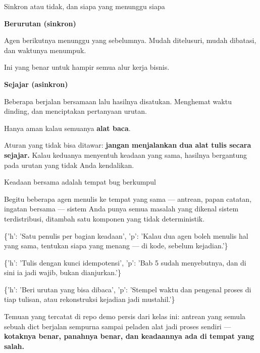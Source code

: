 \documentclass[aspectratio=169,11pt,t]{beamer}
\begin{document}
\begin{frame}[shrink=25]{Sinkron atau tidak, dan siapa yang menunggu siapa}
\begin{minipage}[t]{0.485\textwidth}
{\fontsize{9.4}{12.6}\selectfont\color{fg2}\textbf{Berurutan (sinkron)}\par}\vskip 4pt
{\fontsize{9.4}{12.6}\selectfont\color{fg2}Agen berikutnya menunggu yang sebelumnya. Mudah ditelusuri, mudah dibatasi, dan waktunya menumpuk.\par}\vskip 4pt
{\fontsize{9.4}{12.6}\selectfont\color{fg2}Ini yang benar untuk hampir semua alur kerja bisnis.\par}\vskip 4pt

\end{minipage}%
\hfill
\begin{minipage}[t]{0.485\textwidth}
{\fontsize{9.4}{12.6}\selectfont\color{fg2}\textbf{Sejajar (asinkron)}\par}\vskip 4pt
{\fontsize{9.4}{12.6}\selectfont\color{fg2}Beberapa berjalan bersamaan lalu hasilnya disatukan. Menghemat waktu dinding, dan menciptakan pertanyaan urutan.\par}\vskip 4pt
{\fontsize{9.4}{12.6}\selectfont\color{fg2}Hanya aman kalau semuanya \textbf{alat baca}.\par}\vskip 4pt

\end{minipage}%
\begin{iband}[signal]
Aturan yang tidak bisa ditawar: \textbf{jangan menjalankan dua alat tulis secara sejajar.} Kalau keduanya menyentuh keadaan yang sama, hasilnya bergantung pada urutan yang tidak Anda kendalikan.
\end{iband}
\end{frame}

\begin{frame}[shrink=25]{Keadaan bersama adalah tempat bug berkumpul}
{\fontsize{9.4}{12.6}\selectfont\color{fg2}Begitu beberapa agen menulis ke tempat yang sama --- antrean, papan catatan, ingatan bersama --- sistem Anda punya semua masalah yang dikenal sistem terdistribusi, ditambah satu komponen yang tidak deterministik.\par}\vskip 4pt
\begin{isteps}
\item \{'h': 'Satu penulis per bagian keadaan', 'p': 'Kalau dua agen boleh menulis hal yang sama, tentukan siapa yang menang --- di kode, sebelum kejadian.'\}
\item \{'h': 'Tulis dengan kunci idempotensi', 'p': 'Bab 5 sudah menyebutnya, dan di sini ia jadi wajib, bukan dianjurkan.'\}
\item \{'h': 'Beri urutan yang bisa dibaca', 'p': 'Stempel waktu dan pengenal proses di tiap tulisan, atau rekonstruksi kejadian jadi mustahil.'\}
\end{isteps}
\begin{iband}[signal]
Temuan yang tercatat di repo demo persis dari kelas ini: antrean yang semula sebuah dict berjalan sempurna sampai peladen alat jadi proses sendiri --- \textbf{kotaknya benar, panahnya benar, dan keadaannya ada di tempat yang salah.}
\end{iband}
\end{frame}
\end{document}

